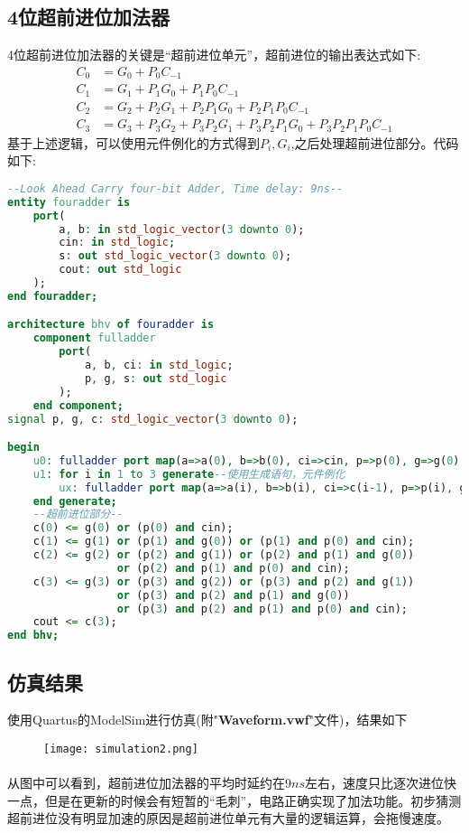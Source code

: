 \documentclass[UTF8, onecolumn, a4paper]{article}
\begin{document}
\subsection{4位超前进位加法器}
4位超前进位加法器的关键是“超前进位单元”，超前进位的输出表达式如下:
\begin{equation*}
\begin{aligned}
	C_0 &= G_0 + P_0C_{-1}\\
	C_1 &= G_1 + P_1G_0 + P_1P_0C_{-1}\\
	C_2 &= G_2 + P_2G_1 + P_2P_1G_0 + P_2P_1P_0C_{-1}\\
	C_3 &= G_3 + P_3G_2 + P_3P_2G_1 + P_3P_2P_1G_0 + P_3P_2P_1P_0C_{-1}
\end{aligned}
\end{equation*}
基于上述逻辑，可以使用元件例化的方式得到$P_i, G_i$,之后处理超前进位部分。代码如下:
\begin{lstlisting}[language={VHDL}, title={fouradder.vhd}]
--Look Ahead Carry four-bit Adder, Time delay: 9ns--
entity fouradder is
	port(
		a, b: in std_logic_vector(3 downto 0);
		cin: in std_logic;
		s: out std_logic_vector(3 downto 0);
		cout: out std_logic
	);
end fouradder;

architecture bhv of fouradder is
	component fulladder
		port(
			a, b, ci: in std_logic;
			p, g, s: out std_logic
		);
	end component;
signal p, g, c: std_logic_vector(3 downto 0);

begin
	u0: fulladder port map(a=>a(0), b=>b(0), ci=>cin, p=>p(0), g=>g(0), s=>s(0));
	u1: for i in 1 to 3 generate--使用生成语句，元件例化
		ux: fulladder port map(a=>a(i), b=>b(i), ci=>c(i-1), p=>p(i), g=>g(i), s=>s(i));
	end generate;
	--超前进位部分--
	c(0) <= g(0) or (p(0) and cin);
	c(1) <= g(1) or (p(1) and g(0)) or (p(1) and p(0) and cin);
	c(2) <= g(2) or (p(2) and g(1)) or (p(2) and p(1) and g(0)) 
				 or (p(2) and p(1) and p(0) and cin);
	c(3) <= g(3) or (p(3) and g(2)) or (p(3) and p(2) and g(1)) 
				 or (p(3) and p(2) and p(1) and g(0)) 
				 or (p(3) and p(2) and p(1) and p(0) and cin);
	cout <= c(3);
end bhv;
\end{lstlisting}
\subsection{仿真结果}
使用Quartus的ModelSim进行仿真(附"\textbf{Waveform.vwf}"文件)，结果如下
\begin{figure}[htb]
	\centering
	\texttt{[image: simulation2.png]}
\end{figure}
\paragraph*{}
从图中可以看到，超前进位加法器的平均时延约在$9ns$左右，速度只比逐次进位快一点，但是在更新的时候会有短暂的“毛刺”，电路正确实现了加法功能。初步猜测超前进位没有明显加速的原因是超前进位单元有大量的逻辑运算，会拖慢速度。
\end{document}
